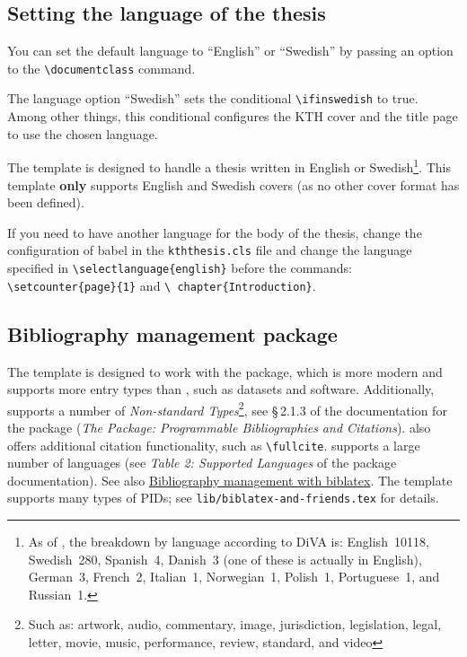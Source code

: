 \documentclass[12pt, twoside]{article}
\newcommand{\fname}[1]{\texttt{#1}}
\begin{document}
\subsection{Setting the language of the thesis}
\label{sec:setLanguageOfThesis}

You can set the default language to \enquote{English} or \enquote{Swedish} by passing an option to the \texttt{\textbackslash documentclass} command.

The language option \enquote{Swedish} sets the conditional \texttt{\textbackslash ifinswedish} to true.  Among other things, this conditional configures the \gls{KTH} cover and the title page to use the chosen language.

The template is designed to handle a thesis written in English or Swedish\footnote{As of {}, the breakdown by language according to \gls{DiVA} is: English~\num{10118},
Swedish~\num{280},
Spanish~\num{4},
Danish~\num{3} (one of these is actually in English),
German~\num{3},
French~\num{2},
Italian~\num{1},
Norwegian~\num{1},
Polish~\num{1},
Portuguese~\num{1}, and
Russian~\num{1}.}. This template \textbf{only} supports English and Swedish covers (as no other cover format has been defined).

If you need to have another language for the body of the thesis, change the configuration of babel in the \texttt{kththesis.cls} file and change the language specified in \texttt{\textbackslash selectlanguage\{english\}} before the commands:
\texttt{\textbackslash setcounter\{page\}\{1\}} and \texttt{\textbackslash 
chapter\{Introduction\}}.


\subsection{Bibliography management package}
\label{sec:cycle3BibMgmtpackage}

The template is designed to work with the \BibLaTeX{} package, which is more modern and supports more entry types than \BibTeX{}, such as datasets and software. Additionally, \BibLaTeX{} supports a number of \textit{Non-standard Types}\footnote{Such as: artwork, audio, commentary, image, jurisdiction, legislation, legal, letter, movie, music, performance, review, standard, and video}, see §\,2.1.3 of the documentation for the \BibLaTeX{} package (\textit{The \BibLaTeX{} Package: Programmable Bibliographies and Citations}). \BibLaTeX{} also offers additional citation functionality, such as \texttt{\textbackslash fullcite}. \BibLaTeX{} supports a large number of languages (see \textit{Table 2: Supported Languages} of the package documentation). See also \href{https://www.overleaf.com/learn/latex/Bibliography_management_with_biblatex}{Bibliography management with biblatex}. The template supports many types of \glspl{PID}; see \fname{lib/biblatex-and-friends.tex} for details.
\end{document}
